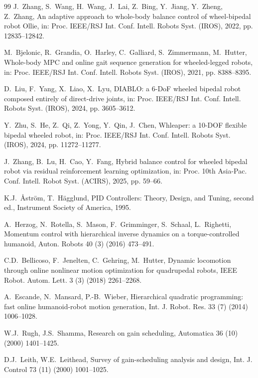 \documentclass[a4paper,fleqn]{cas-dc}
\begin{document}
\begin{thebibliography}{99}
J.~Zhang, S.~Wang, H.~Wang, J.~Lai, Z.~Bing, Y.~Jiang, Y.~Zheng, Z.~Zhang, An
adaptive approach to whole-body balance control of wheel-bipedal robot Ollie,
in: Proc. IEEE/RSJ Int. Conf. Intell. Robots Syst. (IROS), 2022, pp.
12835--12842.

M.~Bjelonic, R.~Grandia, O.~Harley, C.~Galliard, S.~Zimmermann, M.~Hutter,
Whole-body MPC and online gait sequence generation for wheeled-legged robots,
in: Proc. IEEE/RSJ Int. Conf. Intell. Robots Syst. (IROS), 2021, pp.
8388--8395.

D.~Liu, F.~Yang, X.~Liao, X.~Lyu, DIABLO: a 6-DoF wheeled bipedal robot
composed entirely of direct-drive joints, in: Proc. IEEE/RSJ Int. Conf. Intell.
Robots Syst. (IROS), 2024, pp. 3605--3612.

Y.~Zhu, S.~He, Z.~Qi, Z.~Yong, Y.~Qin, J.~Chen, Whleaper: a 10-DOF flexible
bipedal wheeled robot, in: Proc. IEEE/RSJ Int. Conf. Intell. Robots Syst.
(IROS), 2024, pp. 11272--11277.

J.~Zhang, B.~Lu, H.~Cao, Y.~Fang, Hybrid balance control for wheeled bipedal
robot via residual reinforcement learning optimization, in: Proc. 10th
Asia-Pac. Conf. Intell. Robot Syst. (ACIRS), 2025, pp. 59--66.

K.J.~\AA{}str\"{o}m, T.~H\"{a}gglund, PID Controllers: Theory, Design, and
Tuning, second ed., Instrument Society of America, 1995.

A.~Herzog, N.~Rotella, S.~Mason, F.~Grimminger, S.~Schaal, L.~Righetti,
Momentum control with hierarchical inverse dynamics on a torque-controlled
humanoid, Auton. Robots 40 (3) (2016) 473--491.

C.D.~Bellicoso, F.~Jenelten, C.~Gehring, M.~Hutter, Dynamic locomotion through
online nonlinear motion optimization for quadrupedal robots, IEEE Robot. Autom.
Lett. 3 (3) (2018) 2261--2268.

A.~Escande, N.~Mansard, P.-B.~Wieber, Hierarchical quadratic programming: fast
online humanoid-robot motion generation, Int. J. Robot. Res. 33 (7) (2014)
1006--1028.

W.J.~Rugh, J.S.~Shamma, Research on gain scheduling, Automatica 36 (10) (2000)
1401--1425.

D.J.~Leith, W.E.~Leithead, Survey of gain-scheduling analysis and design, Int.
J. Control 73 (11) (2000) 1001--1025.


\end{thebibliography}
\end{document}
